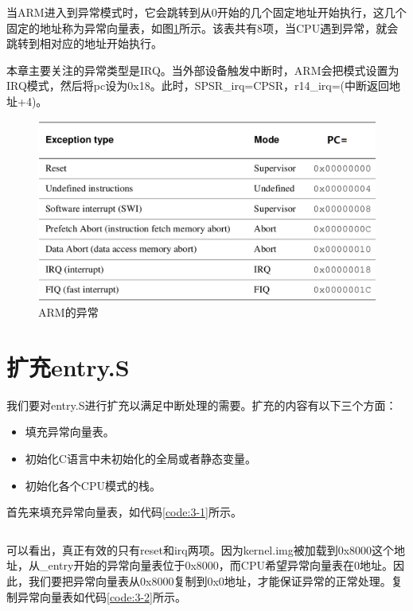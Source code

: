 \documentclass[main.tex]{subfiles}
\begin{document}
\begin{CJK*}{UTF8}{song}
当ARM进入到异常模式时，它会跳转到从0开始的几个固定地址开始执行，这几个固定的地址称为异常向量表，如图\ref{figure:3-2}所示。该表共有8项，当CPU遇到异常，就会跳转到相对应的地址开始执行。

\par
本章主要关注的异常类型是IRQ。当外部设备触发中断时，ARM会把模式设置为IRQ模式，然后将pc设为0x18。此时，SPSR\_irq=CPSR，r14\_irq=(中断返回地址+4)。

\begin{figure}[htp]
\centering
\includegraphics[scale=0.35]{figures/3-2.png}
\caption{ARM的异常}
\label{figure:3-2}
\end{figure}

\section{扩充entry.S}
我们要对entry.S进行扩充以满足中断处理的需要。扩充的内容有以下三个方面：
\begin{itemize}
\item 填充异常向量表。
\item 初始化C语言中未初始化的全局或者静态变量。
\item 初始化各个CPU模式的栈。
\end{itemize}

首先来填充异常向量表，如代码\ref{code:3-1}所示。

\begin{code}
\label{code:3-1}
\inputminted[firstline=73,lastline=104,linenos,numbersep=5pt,frame=lines,framesep=2mm]{gas}{src/chapter03/kernel/entry.S}
\end{code}

可以看出，真正有效的只有reset和irq两项。因为kernel.img被加载到0x8000这个地址，从\_entry开始的异常向量表位于0x8000，而CPU希望异常向量表在0地址。因此，我们要把异常向量表从0x8000复制到0x0地址，才能保证异常的正常处理。复制异常向量表如代码\ref{code:3-2}所示。


\end{CJK*}
\end{document}

